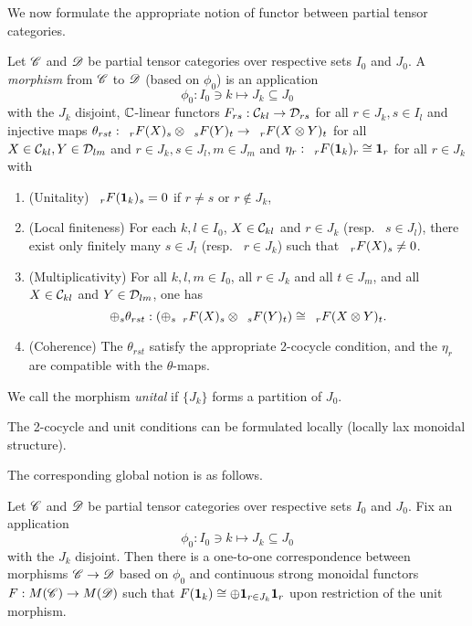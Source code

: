 We now formulate the appropriate notion of functor between partial tensor categories.

\begin{Def} Let $\CatCC$ and $\CatDD$ be partial tensor categories over respective sets $I_0$ and $J_0$. A \emph{morphism} from $\CatCC$ to $\CatDD$ (based on $\phi_0$) is an application \[ \phi_0: I_0\ni k \mapsto J_k\subseteq J_0\] with the $J_k$ disjoint, $\C$-linear functors $F_{rs}: \CatC_{kl}\rightarrow \CatD_{rs}$ for all $r\in J_k, s\in I_l$ and  injective maps $\theta_{rst}: \GrDA{F(X)}{r}{s} \otimes \GrDA{F(Y)}{s}{t} \rightarrow \GrDA{F(X\otimes Y)}{r}{t}$ for all $X\in \CatC_{kl},Y\in \CatD_{lm}$ and $r\in J_k,s\in J_l,m\in J_m$ and $\eta_{r}: \GrDA{F(\Unit_k)}{r}{r} \cong \Unit_r$ for all $r\in J_k$ with \begin{enumerate}[label=(\alph*)]
\item (Unitality) $\GrDA{F(\Unit_k)}{r}{s}= 0$ if $r\neq s$ or $r\notin J_k$,
\item (Local finiteness) For each $k,l\in I_0$, $X\in \CatC_{kl}$ and $r\in J_k$ (resp.~ $s\in J_l$), there exist only finitely many $s\in J_l$ (resp.~ $r\in J_k$) such that $\GrDA{F(X)}{r}{s} \neq 0$.
\item (Multiplicativity) For all $k,l,m\in I_0$, all $r\in J_k$ and all $t\in J_m$, and all $X\in \CatC_{kl}$ and $Y\in \CatD_{lm}$, one has\[\oplus_s \theta_{rst}: \left(\oplus_s \GrDA{F(X)}{r}{s} \otimes \GrDA{F(Y)}{s}{t}\right) \cong \GrDA{F(X\otimes Y)}{r}{t}.\]
\item (Coherence) The $\theta_{rst}$ satisfy the appropriate 2-cocycle condition, and the $\eta_r$ are compatible with the $\theta$-maps.  
\end{enumerate}
We call the morphism \emph{unital} if $\{J_k\}$ forms a partition of $J_0$.
\end{Def}

\begin{Rem} The 2-cocycle and unit conditions can be formulated locally (locally lax monoidal structure).\end{Rem}

The corresponding global notion is as follows.

\begin{Lem} Let $\CatCC$ and $\CatDD$ be partial tensor categories over respective sets $I_0$ and $J_0$. Fix an application \[\phi_0: I_0\ni k \mapsto J_k\subseteq J_0\] with the $J_k$ disjoint. Then there is a one-to-one correspondence between morphisms $\CatCC\rightarrow \CatDD$ based on $\phi_0$ and continuous strong monoidal functors $F:M(\CatCC)\rightarrow M(\CatDD)$ such that $F(\Unit_k) \cong \oplus \Unit_{r\in J_k} \Unit_r$ upon restriction of the unit morphism. %
\end{Lem} 

